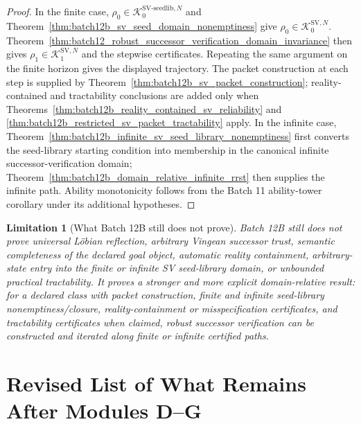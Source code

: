 \documentclass[11pt]{article}
\newtheorem{limitation}[theorem]{Limitation}
\newcommand{\1}{\mathbf{1}}
\providecommand{\Kcal}{\mathcal{K}}
\begin{document}
\begin{proof}
In the finite case, \(\rho_0\in\Kcal_0^{\mathrm{SV\mbox{-}seedlib},N}\) and Theorem~\ref{thm:batch12b_sv_seed_domain_nonemptiness} give \(\rho_0\in\Kcal_0^{\mathrm{SV},N}\).  Theorem~\ref{thm:batch12_robust_successor_verification_domain_invariance} then gives \(\rho_1\in\Kcal_1^{\mathrm{SV},N}\) and the stepwise certificates.  Repeating the same argument on the finite horizon gives the displayed trajectory.  The packet construction at each step is supplied by Theorem~\ref{thm:batch12b_sv_packet_construction}; reality-contained and tractability conclusions are added only when Theorems~\ref{thm:batch12b_reality_contained_sv_reliability} and \ref{thm:batch12b_restricted_sv_packet_tractability} apply.  In the infinite case, Theorem~\ref{thm:batch12b_infinite_sv_seed_library_nonemptiness} first converts the seed-library starting condition into membership in the canonical infinite successor-verification domain; Theorem~\ref{thm:batch12b_domain_relative_infinite_rrst} then supplies the infinite path.  Ability monotonicity follows from the Batch 11 ability-tower corollary under its additional hypotheses.
\end{proof}

\begin{limitation}[What Batch 12B still does not prove]
\label{lim:batch12b_remaining_limitations}
Batch 12B still does not prove universal L\"obian reflection, arbitrary Vingean successor trust, semantic completeness of the declared goal object, automatic reality containment, arbitrary-state entry into the finite or infinite SV seed-library domain, or unbounded practical tractability.  It proves a stronger and more explicit domain-relative result: for a declared class with packet construction, finite and infinite seed-library nonemptiness/closure, reality-containment or misspecification certificates, and tractability certificates when claimed, robust successor verification can be constructed and iterated along finite or infinite certified paths.
\end{limitation}

\section{Revised List of What Remains After Modules D--G}
\label{sec:what_remains_after_D_G}
\end{document}
